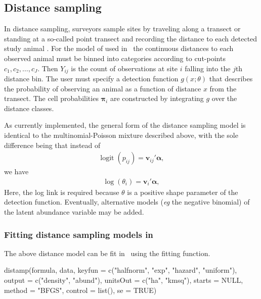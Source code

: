 \documentclass[article,shortnames]{jss}
\DeclareMathOperator{\logit}{logit}
\newcommand{\um}{\pkg{unmarked}}
\begin{document}
\subsection{Distance sampling}

In distance sampling, surveyors sample sites by traveling along a
transect or standing at a so-called point transect and recording the
distance to each detected study animal
\citep{Thomas2010}.  For the model of \citep{Royle2004b} used in \um\,
the continuous distances to each observed animal must be binned into 
categories according to cut-points $c_1, c_2,\dots,c_{J}$.  
Then  $Y_{ij}$ is the count of observations at site $i$ falling into
the $j$th distance bin.  The user must specify a
detection function $g(x;\theta)$ that describes the probability of
observing an animal as a function of distance $x$ from the transect. 
The cell probabilities $\mathbf \pi_i$ are
constructed by integrating $g$ over the distance classes.

As currently implemented, the general form of the distance sampling model
is identical to the multinomial-Poisson mixture described above, with the
sole difference being that instead of
\begin{gather}
  \logit(p_{ij}) = \mathbf v_{ij}' \mathbf \alpha,
\end{gather}
we have 
\begin{gather}
  \log(\theta_i) = \mathbf v_{i}' \mathbf \alpha,
\end{gather}
Here, the log link is required because $\theta$ is a positive shape parameter 
of the detection function. Eventually, alternative models 
(\emph{eg} the negative binomial) of the latent abundance variable may be added.


\subsubsection[Fitting distance sampling models in unmarked]{Fitting distance sampling models in }

The above distance model can be fit in \um\ using the 
fitting function.

\begin{Code}
distamp(formula, data, keyfun = c("halfnorm", "exp", "hazard", 
    "uniform"), output = c("density", "abund"), unitsOut = c("ha", 
    "kmsq"), starts = NULL, method = "BFGS", control = list(), 
    se = TRUE)
\end{Code}
\end{document}
